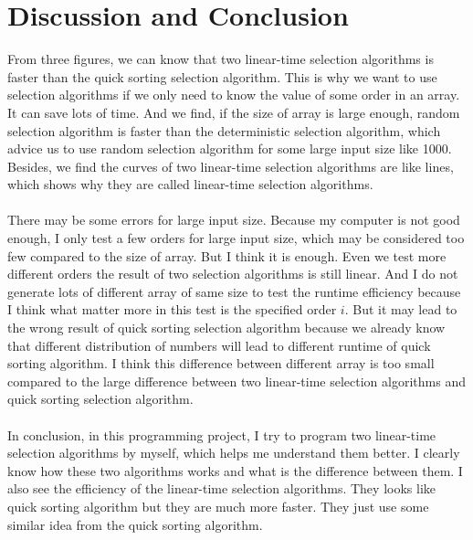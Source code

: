 \documentclass{article}
\begin{document}
\section{Discussion and Conclusion}
From three figures, we can know that two linear-time selection algorithms is faster than the quick sorting selection algorithm. This is why we want to use selection algorithms if we only need to know the value of some order in an array. It can save lots of time. And we find, if the size of array is large enough, random selection algorithm is faster than the deterministic selection algorithm, which advice us to use random selection algorithm for some large input size like 1000. Besides, we find the curves of two linear-time selection algorithms are like lines, which shows why they are called linear-time selection algorithms. \\
\\
There may be some errors for large input size. Because my computer is not good enough, I only test a few orders for large input size, which may be considered too few compared to the size of array. But I think it is enough. Even we test more different orders the result of two selection algorithms is still linear. And I do not generate lots of different array of same size to test the runtime efficiency because I think what matter more in this test is the specified order $i$. But it may lead to the wrong result of quick sorting selection algorithm because we already know that different distribution of numbers will lead to different runtime of quick sorting algorithm. I think this difference between different array is too small compared to the large difference between two linear-time selection algorithms and quick sorting selection algorithm.\\
\\
In conclusion, in this programming project, I try to program two linear-time selection algorithms by myself, which helps me understand them better. I clearly know how these two algorithms works and what is the difference between them. I also see the efficiency of the linear-time selection algorithms. They looks like quick sorting algorithm but they are much more faster. They just use some similar idea from the quick sorting algorithm. \\
\end{document}
